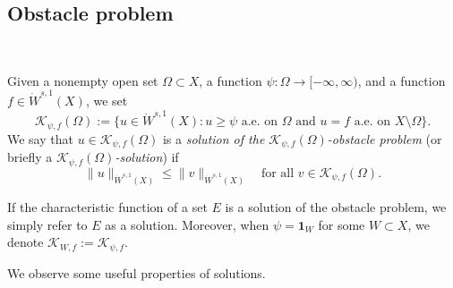 \documentclass[11pt,leqno]{amsart}
\numberwithin{equation}{section}
\theoremstyle{definition}
\begin{document}
	\subsection{Obstacle problem}\
	
	Given a nonempty  open set $\Omega\subset X$, a function $\psi:\Omega\to [-\infty,\infty)$,
	and a  function $f\in \dot W^{s,1}(X)$, we set
	\[
	\mathcal K_{\psi,f}(\Omega):=\{u\in \dot W^{s,1}(X):u\geq \psi \text{ a.e. on } \Omega \text{ and } u=f \text{ a.e. on } X\setminus \Omega \}.
	\]
	We say that $u\in \mathcal{K}_{\psi, f}(\Omega)$ is a \emph{solution of the $\mathcal{K}_{\psi,f}(\Omega)$-obstacle problem}
	(or briefly a \emph{$\mathcal K_{\psi,f}(\Omega)$-solution}) if 
	$$\|u\|_{\dot W^{s,1}(X)}\leq \|v\|_{\dot W^{s,1}(X)}\quad 
	\text{for all $v\in  \mathcal{K}_{\psi, f}(\Omega)$.}$$ 
	
	If the characteristic function of a set $E$ is a solution of the obstacle problem, we simply refer to $E$ as a solution. Moreover, when $\psi=\mathbf{1}_W$ for some $W\subset X$, we denote $\mathcal{K}_{W,f}:=\mathcal{K}_{\psi,f}$.
	
	We observe some useful properties of solutions.
	
\end{document}
